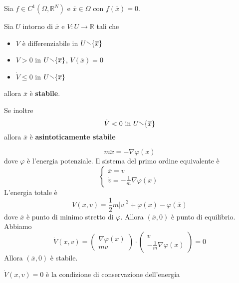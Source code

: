 \begin{theorem}
    Sia \(f \in C^1{(\Omega, \mathbb{R}^{N})} \) e \( \overline{x} \in \Omega\)
    con \(f{(\overline{x})} = 0\).

    Sia \(U\) intorno di \(\overline{x}\) e \(V : U \to \mathbb{R}\) tali che
\begin{itemize}[label = --]
    \item \(V\) è differenziabile in \(U \sminus \{\overline{x}\} \) 
    \item \(V > 0\) in \(U \sminus \{\overline{x}\} \), \(V{(\overline{x})} = 0\) 
    \item \(\dot{V} \le 0\) in \(U \sminus \{\overline{x}\} \) 
\end{itemize}
allora \(\overline{x}\) è \textbf{stabile}.

Se inoltre
\[
    \dot{V} < 0 \text{ in } U \sminus \{\overline{x}\}
\]
allora \(\overline{x}\) è \textbf{asintoticamente stabile}
\end{theorem}
\begin{example}\label{ex:campo-conservativo}
    \[
      m\ddot{x} = -\nabla \varphi {(x)}
    \]
    dove \(\varphi \) è l'energia potenziale. Il sistema del primo ordine
    equivalente è
    \[
      \begin{cases}
          \overline{x} = v \\
          \dot{v} = -\frac{1}{m}\nabla \varphi {(x)}
      \end{cases}
    \]
    L'energia totale è \[V{(x, v)} = \frac{1}{2}m |v|^2 + \varphi {(x)}- \varphi {(\overline{x})}\] dove
    \(\overline{x}\) è punto di minimo stretto di \(\varphi \). Allora
    \({(\overline{x}, 0)}\) è punto di equilibrio. Abbiamo
    \[
      \dot{V}{(x, v)} = \begin{pmatrix}
           \nabla \varphi {(x)} \\
           mv
      \end{pmatrix} \cdot  \begin{pmatrix}
          v \\
          -\frac{1}{m}\nabla \varphi {(x)}
      \end{pmatrix} = 0
    \]
    Allora \({(\overline{x}, 0)}\) è stabile.
    \begin{remark}
        \(\dot{V}{(x,v)} = 0\) è la condizione di conservazione dell'energia
    \end{remark}
\end{example}

